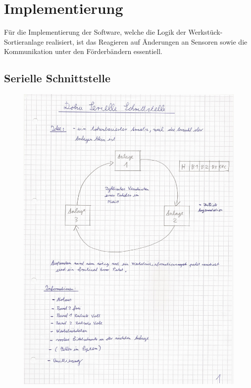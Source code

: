 \documentclass[a4paper, 11pt]{article}
\begin{document}
\newpage

\section{Implementierung}
Für die Implementierung der Software, welche die Logik der Werkstück-Sortieranlage realisiert, ist das Reagieren auf Änderungen an Sensoren sowie die Kommunikation unter den Förderbändern essentiell.

\subsection{Serielle Schnittstelle}
\begin{figure}[H]
\centering 
    \includegraphics[scale=0.69]{SI/si1.jpg}
    \label{si1}
\end{figure}

\newpage
\end{document}
